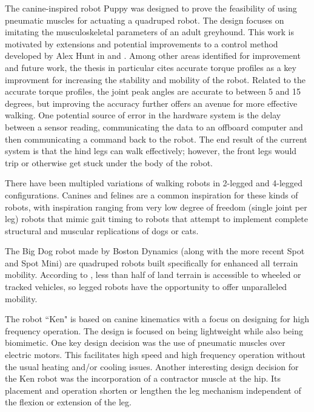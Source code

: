 
The canine-inspired robot Puppy was designed to prove the feasibility of using
pneumatic muscles for actuating a quadruped robot. The design focuses on 
imitating the musculoskeletal parameters of an adult greyhound. 
\cite{PuppyDesign} This work is motivated by extensions and potential
improvements to a control method developed by Alex Hunt in
\cite{HuntPhDThesis} and \cite{HuntHindLegWalking}. Among other areas identified
for improvement and future work, the thesis in particular cites accurate torque
profiles as a key improvment for increasing the stability and mobility of the
robot. Related to the accurate torque profiles, the joint peak angles are
accurate to between 5 and 15 degrees, but improving the accuracy further offers
an avenue for more effective walking. One potential source of error in the
hardware system is the delay between a sensor reading, communicating the data to
an offboard computer and then communicating a command back to the robot. The end
result of the current system is that the hind legs can walk effectively;
however, the front legs would trip or otherwise get stuck under the body of the
robot.


There have been multipled variations of walking robots in 2-legged and 4-legged
configurations. Canines and felines are a common inspiration for these kinds of
robots, with inspiration ranging from very low degree of freedom (single joint
per leg) robots that mimic gait timing to robots that attempt to implement
complete structural and muscular replications of dogs or cats.


The Big Dog robot made by Boston Dynamics (along with the more recent Spot and
Spot Mini) are quadruped robots built specifically for enhanced all terrain
mobility. According to \cite{BigDog}, less than half of land terrain is
accessible to wheeled or tracked vehicles, so legged robots have the opportunity
to offer unparalleled mobility.

The robot ``Ken" is based on canine kinematics with a focus on designing for
high frequency operation. The design is focused on being lightweight while also
being biomimetic. One key design decision was the use of pneumatic muscles over
electric motors. This facilitates high speed and high frequency operation
without the usual heating and/or cooling issues. Another interesting design
decision for the Ken robot was the incorporation of a contractor muscle at the
hip. Its placement and operation shorten or lengthen the leg mechanism
independent of the flexion or extension of the leg.
\cite{Narioka2012}

